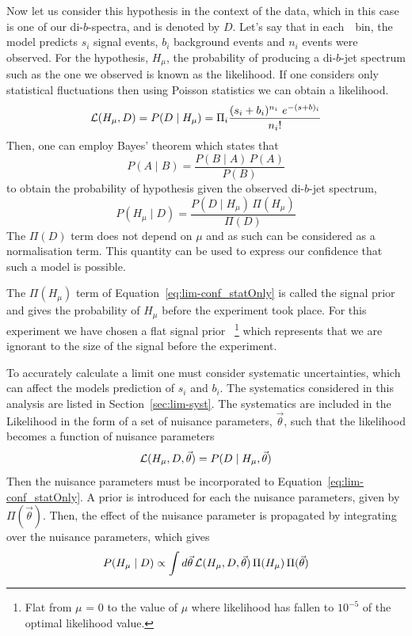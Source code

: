 Now let us consider this hypothesis in the context of the data,
which in this case is one of our di-$b$-spectra, and is denoted by $D$.
Let's say that in each~\mjj~bin, the model predicts
$s_i$ signal events, $b_i$ background events and $n_i$ events were observed.
For the hypothesis, $H_\mu$, the probability of producing a di-$b$-jet spectrum
such as the one we observed is known as the likelihood.
If one considers only statistical fluctuations then using Poisson statistics we can obtain a likelihood.
\begin{equation}
  \mathcal{L} (H_\mu,D) = P(D \mid H_\mu) =  \Pi_i \frac{(s_i+b_i)^{n_i}~e^{-(s+b)_i}}{n_i!}
\end{equation}
Then, one can employ Bayes' theorem which states that
\begin{equation}
  P(A \mid B) = \frac{P(B \mid A) \, P(A)}{P(B)}
\end{equation}
to obtain the probability of hypothesis given the observed di-$b$-jet spectrum,
\begin{equation}
  P(H_\mu \mid D) = \frac{ P(D \mid H_\mu) \, \Pi( H_\mu ) }{ \Pi( D ) }
  \label{eq:lim-conf_statOnly}
\end{equation}
The $\Pi(D)$ term does not depend on $\mu$ and as such can be considered as a normalisation term.
This quantity can be used to express our confidence that such a model is possible.

The $\Pi( H_\mu )$ term of Equation~\ref{eq:lim-conf_statOnly} is called the signal prior
and gives the probability of $H_\mu$ before the experiment took place.
For this experiment we have chosen a flat signal prior~
\footnote{Flat from $\mu$ = 0 to the value of $\mu$ where
likelihood has fallen to $10^{-5}$ of the optimal likelihood value.}
which represents that we are ignorant to the size of the signal before the experiment.

To accurately calculate a limit one must consider systematic uncertainties,
which can affect the models prediction of $s_i$ and $b_i$.
The systematics considered in this analysis are listed in Section~\ref{sec:lim-syst}.
The systematics are included in the Likelihood in the form of a set of nuisance parameters, $\vec{\theta}$,
such that the likelihood becomes a function of nuisance parameters
\begin{equation}
  \mathcal{L} (H_\mu,D,\vec{\theta}) = P(D \mid H_\mu, \vec{\theta} ) 
\end{equation}
Then the nuisance parameters must be incorporated to Equation~\ref{eq:lim-conf_statOnly}.
A prior is introduced for each the nuisance parameters, given by $\Pi(\vec{\theta})$.
Then, the effect of the nuisance parameter is propagated by integrating over
the nuisance parameters, which gives
\begin{equation}
  P(H_\mu \mid D) \propto \int d \vec{\theta} \, \mathcal{L} (H_\mu, D, \vec{\theta} ) \, \Pi( H_\mu )  \, \Pi(\vec{\theta})
  \label{eq:lim-conf_syst}
\end{equation}

